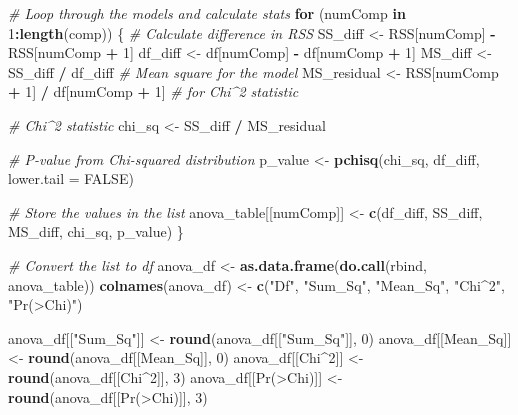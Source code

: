 \documentclass[
]{article}
\newenvironment{Shaded}{\begin{snugshade}}{\end{snugshade}}
\newcommand{\AttributeTok}[1]{\textcolor[rgb]{0.13,0.29,0.53}{#1}}
\newcommand{\CommentTok}[1]{\textcolor[rgb]{0.56,0.35,0.01}{\textit{#1}}}
\newcommand{\ConstantTok}[1]{\textcolor[rgb]{0.56,0.35,0.01}{#1}}
\newcommand{\ControlFlowTok}[1]{\textcolor[rgb]{0.13,0.29,0.53}{\textbf{#1}}}
\newcommand{\DecValTok}[1]{\textcolor[rgb]{0.00,0.00,0.81}{#1}}
\newcommand{\FunctionTok}[1]{\textcolor[rgb]{0.13,0.29,0.53}{\textbf{#1}}}
\newcommand{\NormalTok}[1]{#1}
\newcommand{\OtherTok}[1]{\textcolor[rgb]{0.56,0.35,0.01}{#1}}
\newcommand{\SpecialCharTok}[1]{\textcolor[rgb]{0.81,0.36,0.00}{\textbf{#1}}}
\newcommand{\StringTok}[1]{\textcolor[rgb]{0.31,0.60,0.02}{#1}}
\begin{document}
\begin{Shaded}
\begin{Highlighting}[]
  \CommentTok{\# Loop through the models and calculate stats}
  \ControlFlowTok{for}\NormalTok{ (numComp }\ControlFlowTok{in} \DecValTok{1}\SpecialCharTok{:}\FunctionTok{length}\NormalTok{(comp)) \{}
    \CommentTok{\# Calculate difference in RSS}
\NormalTok{    SS\_diff }\OtherTok{\textless{}{-}}\NormalTok{ RSS[numComp] }\SpecialCharTok{{-}}\NormalTok{ RSS[numComp }\SpecialCharTok{+} \DecValTok{1}\NormalTok{]}
\NormalTok{    df\_diff }\OtherTok{\textless{}{-}}\NormalTok{ df[numComp] }\SpecialCharTok{{-}}\NormalTok{ df[numComp }\SpecialCharTok{+} \DecValTok{1}\NormalTok{]}
\NormalTok{    MS\_diff }\OtherTok{\textless{}{-}}\NormalTok{ SS\_diff }\SpecialCharTok{/}\NormalTok{ df\_diff  }\CommentTok{\# Mean square for the model}
\NormalTok{    MS\_residual }\OtherTok{\textless{}{-}}\NormalTok{ RSS[numComp }\SpecialCharTok{+} \DecValTok{1}\NormalTok{] }\SpecialCharTok{/}\NormalTok{ df[numComp }\SpecialCharTok{+} \DecValTok{1}\NormalTok{]  }\CommentTok{\# for Chi\^{}2 statistic}

    \CommentTok{\# Chi\^{}2 statistic}
\NormalTok{    chi\_sq }\OtherTok{\textless{}{-}}\NormalTok{ SS\_diff }\SpecialCharTok{/}\NormalTok{ MS\_residual}

    \CommentTok{\# P{-}value from Chi{-}squared distribution}
\NormalTok{    p\_value }\OtherTok{\textless{}{-}} \FunctionTok{pchisq}\NormalTok{(chi\_sq, df\_diff, }\AttributeTok{lower.tail =} \ConstantTok{FALSE}\NormalTok{)}

    \CommentTok{\# Store the values in the list}
\NormalTok{    anova\_table[[numComp]] }\OtherTok{\textless{}{-}} \FunctionTok{c}\NormalTok{(df\_diff, SS\_diff, MS\_diff, chi\_sq, p\_value)}
\NormalTok{  \}}

  \CommentTok{\# Convert the list to df}
\NormalTok{  anova\_df }\OtherTok{\textless{}{-}} \FunctionTok{as.data.frame}\NormalTok{(}\FunctionTok{do.call}\NormalTok{(rbind, anova\_table))}
  \FunctionTok{colnames}\NormalTok{(anova\_df) }\OtherTok{\textless{}{-}} \FunctionTok{c}\NormalTok{(}\StringTok{"Df"}\NormalTok{, }\StringTok{"Sum\_Sq"}\NormalTok{, }\StringTok{"Mean\_Sq"}\NormalTok{, }\StringTok{"Chi\^{}2"}\NormalTok{, }\StringTok{"Pr(\textgreater{}Chi)"}\NormalTok{)}

\NormalTok{  anova\_df[[}\StringTok{"Sum\_Sq"}\NormalTok{]] }\OtherTok{\textless{}{-}} \FunctionTok{round}\NormalTok{(anova\_df[[}\StringTok{"Sum\_Sq"}\NormalTok{]], }\DecValTok{0}\NormalTok{)}
\NormalTok{  anova\_df[[}\StringTok{\textquotesingle{}Mean\_Sq\textquotesingle{}}\NormalTok{]] }\OtherTok{\textless{}{-}} \FunctionTok{round}\NormalTok{(anova\_df[[}\StringTok{\textquotesingle{}Mean\_Sq\textquotesingle{}}\NormalTok{]], }\DecValTok{0}\NormalTok{)}
\NormalTok{  anova\_df[[}\StringTok{\textquotesingle{}Chi\^{}2\textquotesingle{}}\NormalTok{]] }\OtherTok{\textless{}{-}} \FunctionTok{round}\NormalTok{(anova\_df[[}\StringTok{\textquotesingle{}Chi\^{}2\textquotesingle{}}\NormalTok{]], }\DecValTok{3}\NormalTok{)}
\NormalTok{  anova\_df[[}\StringTok{\textquotesingle{}Pr(\textgreater{}Chi)\textquotesingle{}}\NormalTok{]] }\OtherTok{\textless{}{-}} \FunctionTok{round}\NormalTok{(anova\_df[[}\StringTok{\textquotesingle{}Pr(\textgreater{}Chi)\textquotesingle{}}\NormalTok{]], }\DecValTok{3}\NormalTok{)}



\end{Highlighting}
\end{Shaded}
\end{document}

